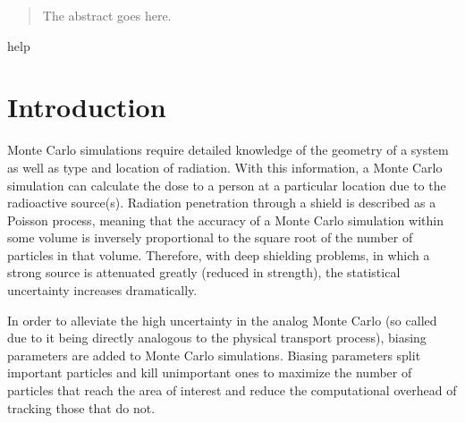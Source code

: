 \documentclass[conference]{IEEEtran}
\begin{document}




\maketitle

\begin{abstract}
The abstract goes here.
\end{abstract}

\begin{IEEEkeywords}
help
\end{IEEEkeywords}

%
\IEEEpeerreviewmaketitle



\section{Introduction}
Monte Carlo simulations require detailed knowledge of the geometry of a system as well as type and location of radiation. With this information, a Monte Carlo simulation can calculate the dose to a person at a particular location due to the radioactive source(s). Radiation penetration through a shield is described as a Poisson process, meaning that the accuracy of a Monte Carlo simulation within some volume is inversely proportional to the square root of the number of particles in that volume. Therefore, with deep shielding problems, in which a strong source is attenuated greatly (reduced in strength), the statistical uncertainty increases dramatically. 

In order to alleviate the high uncertainty in the analog Monte Carlo (so called due to it being directly analogous to the physical transport process), biasing parameters are added to Monte Carlo simulations. Biasing parameters split important particles and kill unimportant ones to maximize the number of particles that reach the area of interest and reduce the computational overhead of tracking those that do not.
\end{document}
